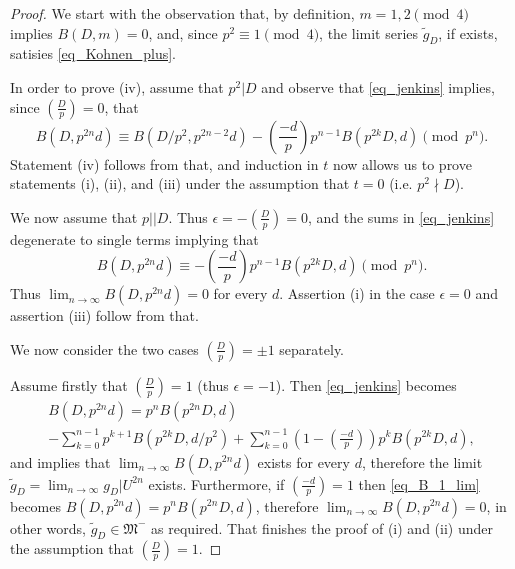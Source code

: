 \documentclass[11pt,letterpaper]{amsart}
\newcommand{\gM}{{\mathfrak M}}
\theoremstyle{remark}
\begin{document}
\begin{proof}

We start with the observation that, by definition, $m = 1,2 \pmod{4}$ implies $B(D,m) =0$, and, since $p^2 \equiv 1 \pmod 4$, 
the limit series $\tilde{g}_D$, if exists, satisies \eqref{eq_Kohnen_plus}.

In order to prove (iv), assume that $p^2|D$ and observe that   \eqref{eq_jenkins} implies, since $\left(\frac{D}{p}\right)=0$, that
\[
B(D,p^{2n}d) \equiv B(D/p^2,p^{2n-2}d) - \left( \frac{-d}{p} \right) p^{n-1} B(p^{2k}D,d) \pmod{p^n}.
\]
Statement (iv) follows from that, and induction in $t$ now allows us to prove statements (i), (ii), and (iii) under the assumption that $t=0$ (i.e. $p^2 \nmid D$).

We now assume that $p||D$. Thus $\epsilon =-\left( \frac{D}{p} \right) =0$, and the sums in  \eqref{eq_jenkins}  degenerate to single terms implying that
\[
B(D,p^{2n}d) \equiv - \left( \frac{-d}{p} \right)p^{n-1} B(p^{2k}D,d) \pmod{p^n}.
\]
Thus $\lim_{n \rightarrow \infty} B(D,p^{2n}d) =0$ for every $d$.
Assertion (i) in the case $\epsilon =0$ and assertion (iii) follow from that.

We now consider the two cases $\left(\frac{D}{p} \right) =\pm 1$ separately. 

Assume firstly that $\left(\frac{D}{p} \right) =1$ (thus $\epsilon=-1$). Then \eqref{eq_jenkins} becomes
\begin{multline} \label{eq_B_1_lim}
B(D, p^{2n}d) = p^nB(p^{2n}D,d) \\ - \sum_{k=0}^{n-1} p^{k+1}B(p^{2k}D,d/p^2) + \sum_{k=0}^{n-1} \left(1- \left( \frac{-d}{p} \right) \right) p^k B(p^{2k}D,d),
\end{multline}
and implies that $\lim_{n \rightarrow \infty} B(D,p^{2n}d)$ exists for every $d$, therefore the limit $\tilde{g}_D= \lim_{n \rightarrow \infty} g_D|U^{2n}$ exists.
Furthermore, if $ \left( \frac{-d}{p} \right) = 1$ then \eqref{eq_B_1_lim} becomes $B(D, p^{2n}d) = p^nB(p^{2n}D,d)$, therefore $\lim_{n \rightarrow \infty} B(D, p^{2n}d) =0$,
in other words, $\tilde{g}_D \in \gM^-$ as required. That finishes the proof of (i) and (ii) under the assumption that $\left(\frac{D}{p} \right) =1$.



\end{proof}
\end{document}

